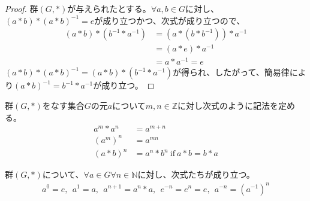 \documentclass[dvipdfmx]{jsarticle}
\begin{document}
\begin{proof}
群$(G,*)$が与えられたとする。$\forall a,b \in G$に対し、$(a*b)*(a*b)^{- 1} = e$が成り立つかつ、次式が成り立つので、
\begin{align*}
(a*b)*\left( b^{- 1}*a^{- 1} \right) &= \left( a*\left( b*b^{- 1} \right) \right)*a^{- 1}\\
&= (a*e)*a^{- 1}\\
&= a*a^{- 1} = e
\end{align*}
$(a*b)*(a*b)^{- 1} = (a*b)*\left( b^{- 1}*a^{- 1} \right)$が得られ、したがって、簡易律により$(a*b)^{- 1} = b^{- 1}*a^{- 1}$が成り立つ。
\end{proof}
\begin{dfn}
群$(G,*)$をなす集合$G$の元$a$について$m,n \in \mathbb{Z}$に対し次式のように記法を定める。
\begin{align*}
a^{m}*a^{n} &= a^{m + n}\\
\left( a^{m} \right)^{n} &= a^{mn}\\
(a*b)^{n} &= a^{n}*b^{n}\ \mathrm{if}\ a*b = b*a
\end{align*}
\end{dfn}
\begin{thm}\label{4.1.1.4}
群$(G,*)$について、$\forall a \in G\forall n \in \mathbb{N}$に対し、次式たちが成り立つ。
\begin{align*}
a^{0} = e,\ \ a^{1} = a,\ \ a^{n + 1} = a^{n}*a,\ \ e^{- n} = e^{n} = e,\ \ a^{- n} = \left( a^{- 1} \right)^{n}
\end{align*}
\end{thm}
\end{document}
